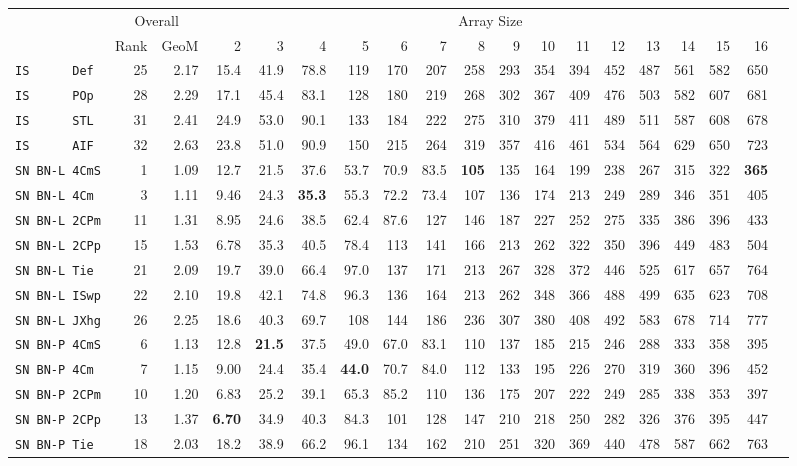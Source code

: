 \begin{tabular}{l | r @{~~} r | r@{~~}r@{~~}r@{~~}r@{~~}r@{~~}r@{~~}r@{~~}r@{~~}r@{~~}r@{~~}r@{~~}r@{~~}r@{~~}r@{~~}r@{~~}r|}
 & \multicolumn{2}{c|}{Overall} & \multicolumn{15}{c}{Array Size} \\
 & Rank & GeoM & 2&3&4&5&6&7&8&9&10&11&12&13&14&15&16\\ \hline
\verb+IS      Def+ & 25 & 2.17 & 15.4&41.9&78.8&119&170&207&258&293&354&394&452&487&561&582&650\\
\verb+IS      POp+ & 28 & 2.29 & 17.1&45.4&83.1&128&180&219&268&302&367&409&476&503&582&607&681\\
\verb+IS      STL+ & 31 & 2.41 & 24.9&53.0&90.1&133&184&222&275&310&379&411&489&511&587&608&678\\
\verb+IS      AIF+ & 32 & 2.63 & 23.8&51.0&90.9&150&215&264&319&357&416&461&534&564&629&650&723\smallskip \\
\verb+SN BN-L 4CmS+ & 1 & 1.09 & 12.7&21.5&37.6&53.7&70.9&83.5&\textbf{105}&135&164&199&238&267&315&322&\textbf{365}\\
\verb+SN BN-L 4Cm + & 3 & 1.11 & 9.46&24.3&\textbf{35.3}&55.3&72.2&73.4&107&136&174&213&249&289&346&351&405\\
\verb+SN BN-L 2CPm+ & 11 & 1.31 & 8.95&24.6&38.5&62.4&87.6&127&146&187&227&252&275&335&386&396&433\\
\verb+SN BN-L 2CPp+ & 15 & 1.53 & 6.78&35.3&40.5&78.4&113&141&166&213&262&322&350&396&449&483&504\\
\verb+SN BN-L Tie + & 21 & 2.09 & 19.7&39.0&66.4&97.0&137&171&213&267&328&372&446&525&617&657&764\\
\verb+SN BN-L ISwp+ & 22 & 2.10 & 19.8&42.1&74.8&96.3&136&164&213&262&348&366&488&499&635&623&708\\
\verb+SN BN-L JXhg+ & 26 & 2.25 & 18.6&40.3&69.7&108&144&186&236&307&380&408&492&583&678&714&777\smallskip \\
\verb+SN BN-P 4CmS+ & 6 & 1.13 & 12.8&\textbf{21.5}&37.5&49.0&67.0&83.1&110&137&185&215&246&288&333&358&395\\
\verb+SN BN-P 4Cm + & 7 & 1.15 & 9.00&24.4&35.4&\textbf{44.0}&70.7&84.0&112&133&195&226&270&319&360&396&452\\
\verb+SN BN-P 2CPm+ & 10 & 1.20 & 6.83&25.2&39.1&65.3&85.2&110&136&175&207&222&249&285&338&353&397\\
\verb+SN BN-P 2CPp+ & 13 & 1.37 & \textbf{6.70}&34.9&40.3&84.3&101&128&147&210&218&250&282&326&376&395&447\\
\verb+SN BN-P Tie + & 18 & 2.03 & 18.2&38.9&66.2&96.1&134&162&210&251&320&369&440&478&587&662&763\\

\end{tabular}
